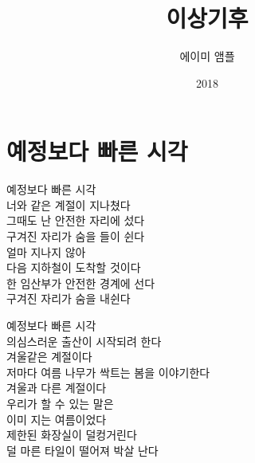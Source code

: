 \documentclass[12pt, b6paper, openany]{memoir}
\title{이상기후}
\author{에이미 앰플}
\date{2018}
\newenvironment{article}{}{}
\begin{document}
\frontmatter
\begin{titlingpage}
\maketitle
\end{titlingpage}
  \tableofcontents
  
\mainmatter
\begin{article}
\hypertarget{uxc608uxc815uxbcf4uxb2e4-uxbe60uxb978-uxc2dcuxac01}{%
\chapter{예정보다 빠른 시각}\label{uxc608uxc815uxbcf4uxb2e4-uxbe60uxb978-uxc2dcuxac01}}

예정보다 빠른 시각\\
너와 같은 계절이 지나쳤다\\
그때도 난 안전한 자리에 섰다\\
구겨진 자리가 숨을 들이 쉰다\\
얼마 지나지 않아\\
다음 지하철이 도착할 것이다\\
한 임산부가 안전한 경계에 선다\\
구겨진 자리가 숨을 내쉰다

예정보다 빠른 시각\\
의심스러운 출산이 시작되려 한다\\
겨울같은 계절이다\\
저마다 여름 나무가 싹트는 봄을 이야기한다\\
겨울과 다른 계절이다\\
우리가 할 수 있는 말은\\
이미 지는 여름이었다\\
제한된 화장실이 덜컹거린다\\
덜 마른 타일이 떨어져 박살 난다
\end{article}
\end{document}
